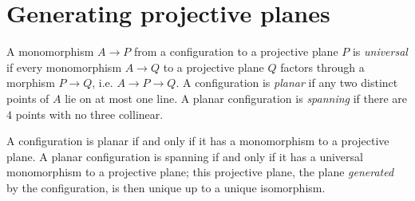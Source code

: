 \section{Generating projective planes}
A monomorphism \(A \to P\) from a configuration to a projective plane \(P\) is \emph{universal} if every monomorphism \(A \to Q\) to a projective plane \(Q\) factors through a morphism \(P \to Q\), i.e. \(A \to P \to Q\).
A configuration is \emph{planar} if any two distinct points of \(A\) lie on at most one line.
A planar configuration is \emph{spanning} if there are \(4\) points with no three collinear.
\begin{lemma}
A configuration is planar if and only if it has a monomorphism to a projective plane.
A planar configuration is spanning if and only if it has a universal monomorphism to a projective plane; this projective plane, the plane \emph{generated} by the configuration, is then unique up to a unique isomorphism.
\end{lemma}
